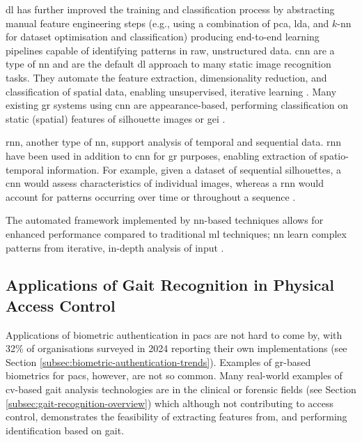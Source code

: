 \ac{dl} has further improved the training and classification process by abstracting manual feature engineering steps (e.g., using a combination of \ac{pca}, \ac{lda}, and $k$-\ac{nn} for dataset optimisation and classification) producing end-to-end learning pipelines capable of identifying patterns in raw, unstructured data.
\acs{cnn} are a type of \ac{nn} and are the default \ac{dl} approach to many static image recognition tasks.
They automate the feature extraction, dimensionality reduction, and classification of spatial data, enabling unsupervised, iterative learning \parencite{bariKinectGaitNetKinectBasedGait2022}.
Many existing \ac{gr} systems using \acs{cnn} are appearance-based, performing classification on static (spatial) features of silhouette images or \acs{gei} \parencite{shenComprehensiveSurveyDeep2023}.

\acs{rnn}, another type of \ac{nn}, support analysis of temporal and sequential data. \acs{rnn} have been used in addition to \acs{cnn} for \ac{gr} purposes, enabling extraction of spatio-temporal information.
For example, given a dataset of sequential silhouettes, a \ac{cnn} would assess characteristics of individual images, whereas a \ac{rnn} would account for patterns occurring over time or throughout a sequence \parencite{hasanSilhouettebasedGaitRecognition2022}.

The automated framework implemented by \ac{nn}-based techniques allows for enhanced performance compared to traditional \ac{ml} techniques; \acs{nn} learn complex patterns from iterative, in-depth analysis of input \parencite{engatiConvolutionalNeuralNetwork2024}.

\subsection{Applications of Gait Recognition in Physical Access Control}
\label{subsec:applications-of-gait-recognition-in-physical-access-control}

Applications of biometric authentication in \ac{pacs} are not hard to come by, with 32\% of organisations surveyed in 2024 reporting their own implementations (see Section \ref{subsec:biometric-authentication-trends}).
Examples of \ac{gr}-based biometrics for \ac{pacs}, however, are not so common.
Many real-world examples of \ac{cv}-based gait analysis technologies are in the clinical or forensic fields (see Section \ref{subsec:gait-recognition-overview}) which although not contributing to access control, demonstrates the feasibility of extracting features from, and performing identification based on gait.

